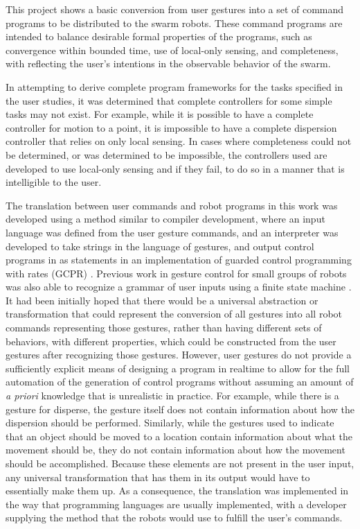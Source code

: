 This project shows a basic conversion from user gestures into a set of command programs to be distributed to the swarm robots.
These command programs are intended to balance desirable formal properties of the programs, such as convergence within bounded time, use of local-only sensing, and completeness, with reflecting the user's intentions in the observable behavior of the swarm. 

In attempting to derive complete program frameworks for the tasks specified in the user studies, it was determined that complete controllers for some simple tasks may not exist. 
For example, while it is possible to have a complete controller for motion to a point, it is impossible to have a complete dispersion controller that relies on only local sensing. 
In cases where completeness could not be determined, or was determined to be impossible, the controllers used are developed to use local-only sensing and if they fail, to do so in a manner that is intelligible to the user. 

The translation between user commands and robot programs in this work was developed using a method similar to compiler development, where an input language was defined from the user gesture commands, and an interpreter was developed to take strings in the language of gestures, and output control programs in as statements in an implementation of guarded control programming with rates (GCPR) \citep{napp2011compositional}.  
Previous work in gesture control for small groups of robots was also able to recognize a grammar of user inputs using a finite state machine \citep{micire2010multi}.
It had been initially hoped that there would be a universal abstraction or transformation that could represent the conversion of all gestures into all robot commands representing those gestures, rather than having different sets of behaviors, with different properties, which could be constructed from the user gestures after recognizing those gestures. 
However, user gestures do not provide a sufficiently explicit means of designing a program in realtime to allow for the full automation of the generation of control programs without assuming an amount of \emph{a priori} knowledge that is unrealistic in practice. 
For example, while there is a gesture for disperse, the gesture itself does not contain information about how the dispersion should be performed. 
Similarly, while the gestures used to indicate that an object should be moved to a location contain information about what the movement should be, they do not contain information about how the movement should be accomplished. 
Because these elements are not present in the user input, any universal transformation that has them in its output would have to essentially make them up. 
As a consequence, the translation was implemented in the way that programming languages are usually implemented, with a developer supplying the method that the robots would use to fulfill the user's commands. 

